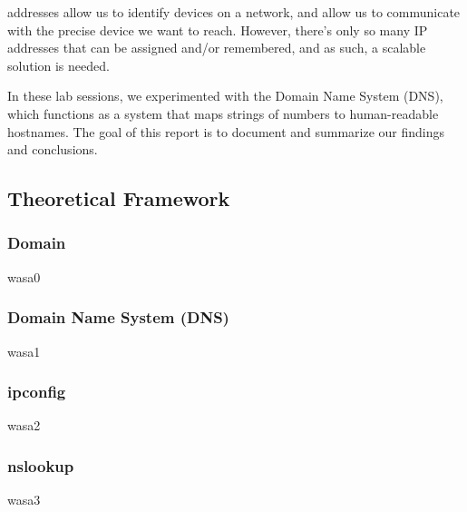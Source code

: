 % 
% 
% 
% 
 addresses allow us to identify devices on a network,
and allow us to communicate with the precise device we want to reach.
However, there's only so many IP addresses that can be assigned and/or remembered, and as such,
a scalable solution is needed.

In these lab sessions, we experimented with the Domain Name System (DNS), which
functions as a system that maps strings of numbers to human-readable hostnames.
The goal of this report is to document and summarize our findings and
conclusions.



\subsection{Theoretical Framework}
\subsubsection{Domain}
wasa0

\subsubsection{Domain Name System (DNS)}
wasa1

\subsubsection{ipconfig}
wasa2

\subsubsection{nslookup}
wasa3

